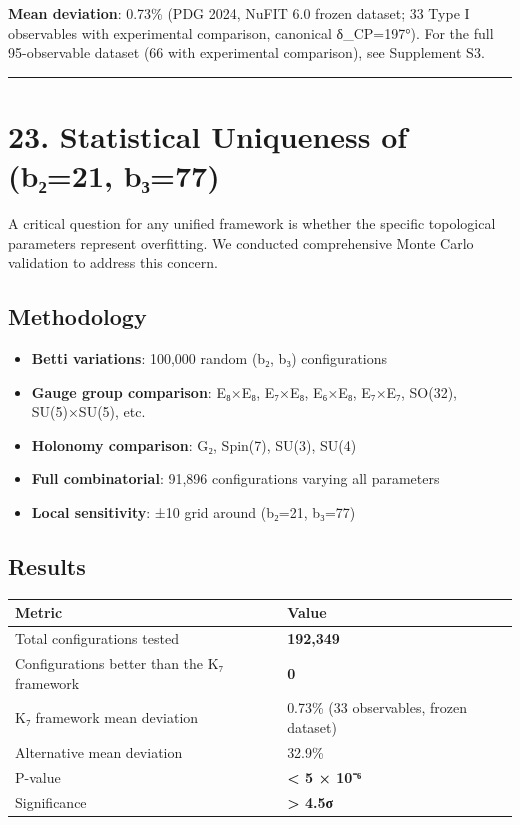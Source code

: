 \documentclass[11pt,a4paper]{article}
\begin{document}
\textbf{Mean deviation}: 0.73\% (PDG 2024, NuFIT 6.0 frozen dataset; 33 Type I observables with experimental comparison, canonical δ\_\allowbreak{}CP=197°). For the full 95-observable dataset (66 with experimental comparison), see Supplement S3.

\begin{center}\rule{\linewidth}{0.5pt}\end{center}

\section{23. Statistical Uniqueness of (b₂=21, b₃=77)}\label{statistical-uniqueness-of-bux208221-bux208377}

A critical question for any unified framework is whether the specific topological parameters represent overfitting. We conducted comprehensive Monte Carlo validation to address this concern.

\subsection{Methodology}\label{methodology}

\begin{itemize}
\tightlist
\item
  \textbf{Betti variations}: 100,000 random (b₂, b₃) configurations
\item
  \textbf{Gauge group comparison}: E₈×E₈, E₇×E₈, E₆×E₈, E₇×E₇, SO(32), SU(5)×SU(5), etc.
\item
  \textbf{Holonomy comparison}: G₂, Spin(7), SU(3), SU(4)
\item
  \textbf{Full combinatorial}: 91,896 configurations varying all parameters
\item
  \textbf{Local sensitivity}: ±10 grid around (b₂=21, b₃=77)
\end{itemize}

\subsection{Results}\label{results}

\begin{longtable}[]{@{}ll@{}}
\toprule\noalign{}
Metric & Value \\
\midrule\noalign{}
\endhead
\bottomrule\noalign{}
\endlastfoot
Total configurations tested & \textbf{192,349} \\
Configurations better than the K₇ framework & \textbf{0} \\
K₇ framework mean deviation & 0.73\% (33 observables, frozen dataset) \\
Alternative mean deviation & 32.9\% \\
P-value & \textbf{\textless{} 5 × 10⁻⁶} \\
Significance & \textbf{\textgreater{} 4.5σ} \\
\end{longtable}
\end{document}
